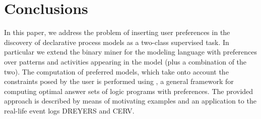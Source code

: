 

\section{Conclusions}
\label{sec:conclusions}

In this paper, we address the problem of inserting user preferences in the discovery of declarative process models as a two-class supervised task. In particular we extend the \nd binary miner for the \declare modeling language with preferences over \declare patterns and activities appearing in the model (plus a combination of the two). 
The computation of preferred models, which take onto account the constraints posed by the user is performed using \asprin, a general framework for computing optimal answer sets of logic programs with preferences. The provided approach is described by means of motivating examples and an application to the real-life event logs DREYERS and CERV. 




